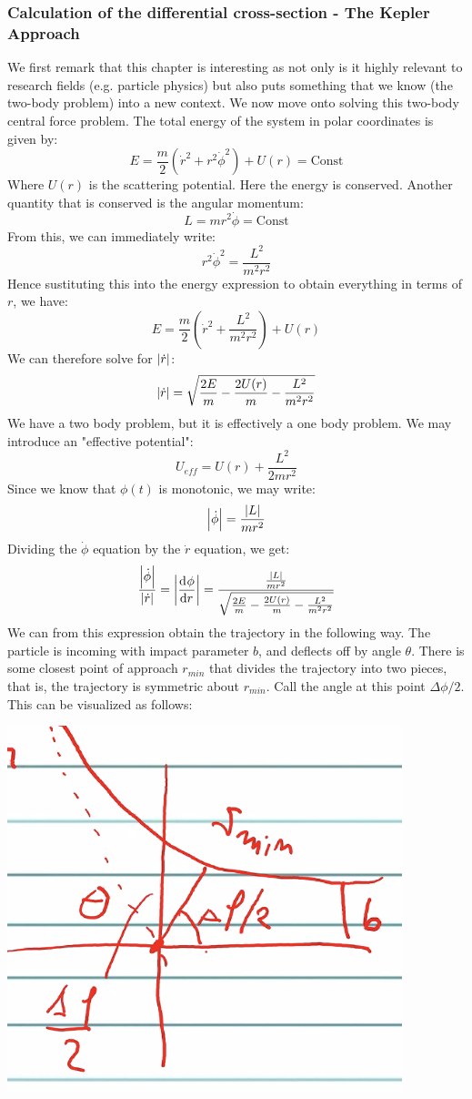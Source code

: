 \subsubsection{Calculation of the differential cross-section - The Kepler Approach}
We first remark that this chapter is interesting as not only is it highly relevant to research fields (e.g. particle physics) but also puts something that we know (the two-body problem) into a new context. We now move onto solving this two-body central force problem. The total energy of the system in polar coordinates is given by:
\[E = \frac{m}{2}\left(\dot{r}^2 + r^2\dot{\phi}^2\right) + U(r) = \text{Const}\]
Where $U(r)$ is the scattering potential. Here the energy is conserved. Another quantity that is conserved is the angular momentum:
\[L = mr^2\dot{\phi} = \text{Const}\]
From this, we can immediately write:
\[r^2\dot{\phi}^2 = \frac{L^2}{m^2r^2}\]
Hence sustituting this into the energy expression to obtain everything in terms of $r$, we have:
\[E = \frac{m}{2}\left(\dot{r}^2 + \frac{L^2}{m^2r^2}\right) + U(r)\]
We can therefore solve for $\abs{\dot{r}}$:
\[\abs{\dot{r}} = \sqrt{\frac{2E}{m} - \frac{2U(r)}{m} - \frac{L^2}{m^2r^2}}\]
We have a two body problem, but it is effectively a one body problem. We may introduce an "effective potential":
\[U_{eff} = U(r) + \frac{L^2}{2mr^2}\]
Since we know that $\phi(t)$ is monotonic, we may write:
\[\abs{\dot{\phi}} = \frac{\abs{L}}{mr^2}\]
Dividing the $\dot{\phi}$ equation by the $\dot{r}$ equation, we get:
\[\frac{\abs{\dot{\phi}}}{\abs{\dot{r}}} = \abs{\dod{\phi}{r}} = \frac{\frac{\abs{L}}{mr^2}}{\sqrt{\frac{2E}{m} - \frac{2U(r)}{m} - \frac{L^2}{m^2r^2}}}\]
We can from this expression obtain the trajectory in the following way. The particle is incoming with impact parameter $b$, and deflects off by angle $\theta$. There is some closest point of approach $r_{min}$ that divides the trajectory into two pieces, that is, the trajectory is symmetric about $r_{min}$. Call the angle at this point $\Delta \phi/2$. This can be visualized as follows:
\begin{center}
    \includegraphics[scale=0.7]{Lecture-28/l28-img2.png}
\end{center}
